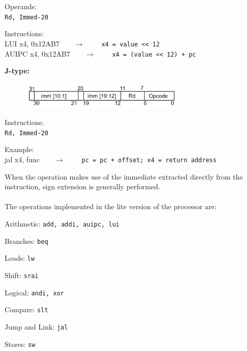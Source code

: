 \begin{description}
\begin{description}
		\item Operands:\\
		\texttt{Rd, Immed-20}
		\item Instructions:\\
		\textsf{LUI x4, 0x12AB7}\ \ \ \ $\longrightarrow$ \ \ \ \ \texttt{x4 = value << 12}\\
		\textsf{AUIPC x4, 0x12AB7}\ \ \ \ $\longrightarrow$ \ \ \ \ \texttt{x4 = (value << 12) + pc}
	\end{description}
	\item \textbf{J-type:}
  \begin{figure}[h!]
    \center
    \includegraphics[width=0.7\textwidth]{sec1/images/Jtype.png}
  \end{figure}
	\begin{description}
		\item Instructions:\\
		\texttt{Rd, Immed-20}
		\item Example:\\
		\textsf{jal x4, func}\ \ \ \ $\longrightarrow$ \ \ \ \ \texttt{pc = pc + offset; x4 = return address}
	\end{description}
\end{description}
When the operation makes use of the immediate extracted directly from the instruction, sign extension is generally performed.\\ \\
The operations implemented in the lite version of the processor are:
\begin{description}
	\item Arithmetic:
	\texttt{add, addi, auipc, lui}
	\item Branches:
	\texttt{beq}
	\item Loads:
	\texttt{lw}
	\item Shift:
	\texttt{srai}
	\item Logical:
	\texttt{andi, xor}
	\item Compare:
	\texttt{slt}
	\item Jump and Link:
	\texttt{jal}
	\item Stores:
	\texttt{sw}
\end{description}
